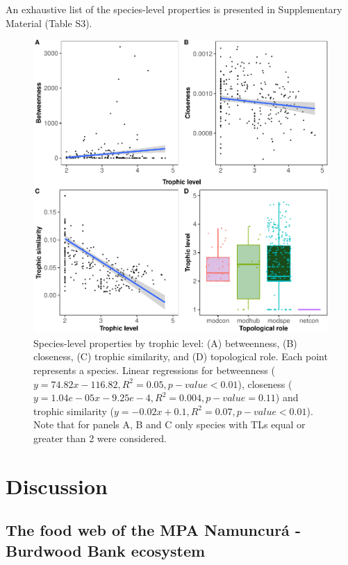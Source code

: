 \documentclass[preprint, 3p,
authoryear]{elsarticle} %
\begin{document}
An exhaustive list of the species-level properties is presented in
Supplementary Material (Table S3).

\begin{figure}

{\centering \includegraphics{MS_Burdwood_foodweb_files/figure-latex/figure4-1} 

}

\caption{Species-level properties by trophic level: (A) betweenness, (B) closeness, (C) trophic similarity, and (D) topological role. Each point represents a species. Linear regressions for betweenness ($y = 74.82x - 116.82, R^2 = 0.05, p-value < 0.01$), closeness ($y = 1.04e-05x - 9.25e-4, R^2 = 0.004, p-value = 0.11$) and trophic similarity ($y = -0.02x + 0.1 , R^2 = 0.07, p-value < 0.01$). Note that for panels A, B and C only species with TLs equal or greater than 2 were considered.}\label{fig:figure4}
\end{figure}

\hypertarget{discussion}{%
\section{Discussion}\label{discussion}}

\hypertarget{the-food-web-of-the-mpa-namuncuruxe1---burdwood-bank-ecosystem}{%
\subsection{The food web of the MPA Namuncurá - Burdwood Bank
ecosystem}\label{the-food-web-of-the-mpa-namuncuruxe1---burdwood-bank-ecosystem}}
\end{document}
